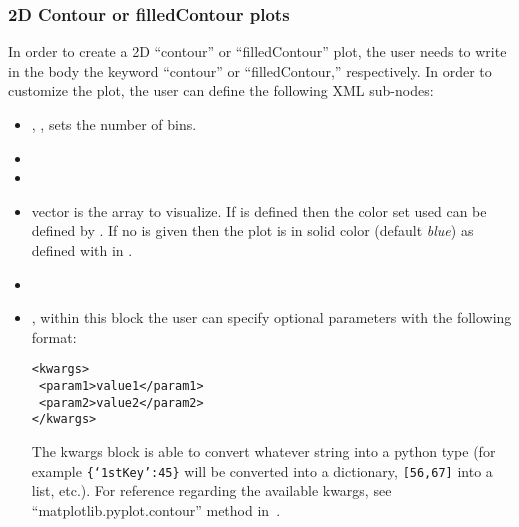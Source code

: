 \subsubsection{2D Contour or filledContour plots}
In order to create a 2D ``contour'' or ``filledContour'' plot, the user needs to
write in the  body the keyword ``contour'' or ``filledContour,''
respectively.
%
In order to customize the plot, the user can define the following XML sub-nodes:
\begin{itemize}
  \item {}, , sets the
  number of bins.
  \item {}
  \item {}
  \item {} vector is the array to visualize.  If  is defined then the color set used can be defined by .
  If no  is given then the plot is in solid color (default \textit{blue}) as defined with  in .
  \item {}
  \item {}, within this block the user can specify optional
  parameters with the following format:

\begin{lstlisting}[style=XML]
<kwargs>
 <param1>value1</param1>
 <param2>value2</param2>
</kwargs>
\end{lstlisting}
  The kwargs block is able to convert whatever string into a python type (for
  example  \texttt{\{`1stKey':45\}} will
  be converted into a dictionary,
   \texttt{[56,67]}  into a list, etc.).
  For reference regarding the available kwargs, see
  ``matplotlib.pyplot.contour'' method in~\cite{MatPlotLib}.
    \end{itemize}

